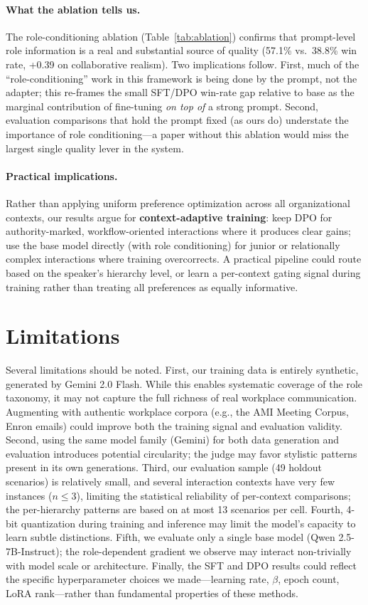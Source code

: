 \documentclass{article}
\begin{document}
\paragraph{What the ablation tells us.} The role-conditioning ablation (Table~\ref{tab:ablation}) confirms that prompt-level role information is a real and substantial source of quality (57.1\% vs.\ 38.8\% win rate, +0.39 on collaborative realism). Two implications follow. First, much of the ``role-conditioning'' work in this framework is being done by the prompt, not the adapter; this re-frames the small SFT/DPO win-rate gap relative to base as the marginal contribution of fine-tuning \emph{on top of} a strong prompt. Second, evaluation comparisons that hold the prompt fixed (as ours do) understate the importance of role conditioning---a paper without this ablation would miss the largest single quality lever in the system.

\paragraph{Practical implications.} Rather than applying uniform preference optimization across all organizational contexts, our results argue for \textbf{context-adaptive training}: keep DPO for authority-marked, workflow-oriented interactions where it produces clear gains; use the base model directly (with role conditioning) for junior or relationally complex interactions where training overcorrects. A practical pipeline could route based on the speaker's hierarchy level, or learn a per-context gating signal during training rather than treating all preferences as equally informative.


\section{Limitations}
\label{sec:limitations}

Several limitations should be noted. First, our training data is entirely synthetic, generated by Gemini 2.0 Flash. While this enables systematic coverage of the role taxonomy, it may not capture the full richness of real workplace communication. Augmenting with authentic workplace corpora (e.g., the AMI Meeting Corpus, Enron emails) could improve both the training signal and evaluation validity. Second, using the same model family (Gemini) for both data generation and evaluation introduces potential circularity; the judge may favor stylistic patterns present in its own generations. Third, our evaluation sample (49 holdout scenarios) is relatively small, and several interaction contexts have very few instances ($n \leq 3$), limiting the statistical reliability of per-context comparisons; the per-hierarchy patterns are based on at most 13 scenarios per cell. Fourth, 4-bit quantization during training and inference may limit the model's capacity to learn subtle distinctions. Fifth, we evaluate only a single base model (Qwen 2.5-7B-Instruct); the role-dependent gradient we observe may interact non-trivially with model scale or architecture. Finally, the SFT and DPO results could reflect the specific hyperparameter choices we made---learning rate, $\beta$, epoch count, LoRA rank---rather than fundamental properties of these methods.
\end{document}
